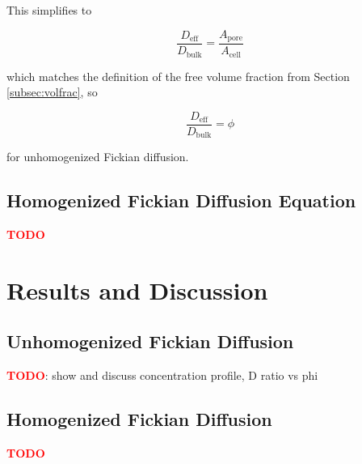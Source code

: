 \documentclass{article}
\begin{document}
This simplifies to

\begin{equation}\frac{D_\mathrm{eff}}{D_\mathrm{bulk}} = \frac{A_\mathrm{pore}}{A_\mathrm{cell}}\end{equation}

which matches the definition of the free volume fraction from Section \ref{subsec:volfrac}, so

\begin{equation}\frac{D_\mathrm{eff}}{D_\mathrm{bulk}} = \phi\end{equation}

for unhomogenized Fickian diffusion.

\subsection{Homogenized Fickian Diffusion Equation}\label{subsec:hom_fick}

\textcolor{red}{\textbf{TODO}}

\section{Results and Discussion}\label{sec:results}

\subsection{Unhomogenized Fickian Diffusion}\label{subsec:results_unhom_fick}

\textcolor{red}{\textbf{TODO}}: show and discuss concentration profile, D ratio vs phi

\subsection{Homogenized Fickian Diffusion}\label{subsec:results_hom_fick}

\textcolor{red}{\textbf{TODO}}
\end{document}
